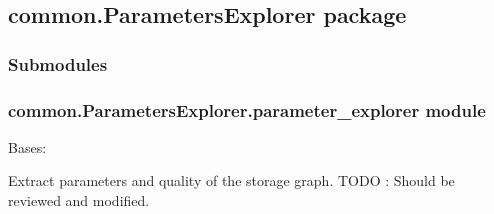 \documentclass[letterpaper,10pt,english]{sphinxmanual}
\begin{document}
\subsection{common.ParametersExplorer package}
\label{\detokenize{common.ParametersExplorer:common-parametersexplorer-package}}\label{\detokenize{common.ParametersExplorer::doc}}

\subsubsection{Submodules}
\label{\detokenize{common.ParametersExplorer:submodules}}

\subsubsection{common.ParametersExplorer.parameter\_explorer module}
\label{\detokenize{common.ParametersExplorer:module-common.ParametersExplorer.parameter_explorer}}\label{\detokenize{common.ParametersExplorer:common-parametersexplorer-parameter-explorer-module}}

\begin{fulllineitems}
\label{\detokenize{common.ParametersExplorer:common.ParametersExplorer.parameter_explorer.ParameterExplorer}}
Bases: 

Extract parameters and quality of the storage graph. TODO : Should be reviewed and modified.

\begin{fulllineitems}
\label{\detokenize{common.ParametersExplorer:common.ParametersExplorer.parameter_explorer.ParameterExplorer.launch}}
\end{fulllineitems}


\end{fulllineitems}
\end{document}
